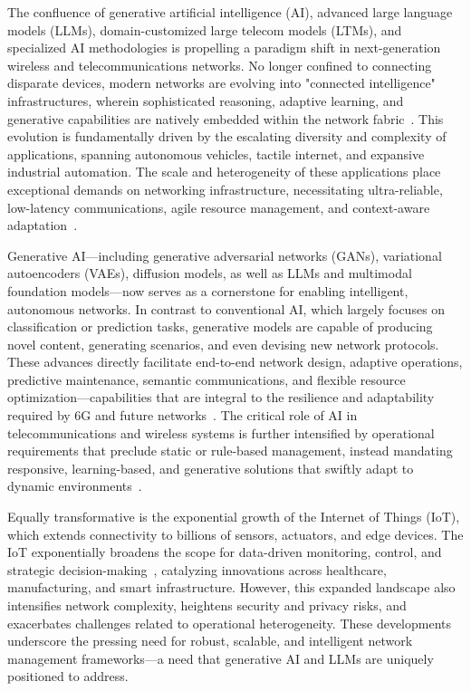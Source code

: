 \documentclass[sigconf]{acmart}
\begin{document}
The confluence of generative artificial intelligence (AI), advanced large language models (LLMs), domain-customized large telecom models (LTMs), and specialized AI methodologies is propelling a paradigm shift in next-generation wireless and telecommunications networks. No longer confined to connecting disparate devices, modern networks are evolving into "connected intelligence" infrastructures, wherein sophisticated reasoning, adaptive learning, and generative capabilities are natively embedded within the network fabric~\cite{ref46,ref49}. This evolution is fundamentally driven by the escalating diversity and complexity of applications, spanning autonomous vehicles, tactile internet, and expansive industrial automation. The scale and heterogeneity of these applications place exceptional demands on networking infrastructure, necessitating ultra-reliable, low-latency communications, agile resource management, and context-aware adaptation~\cite{ref46,ref49}.

Generative AI—including generative adversarial networks (GANs), variational autoencoders (VAEs), diffusion models, as well as LLMs and multimodal foundation models—now serves as a cornerstone for enabling intelligent, autonomous networks. In contrast to conventional AI, which largely focuses on classification or prediction tasks, generative models are capable of producing novel content, generating scenarios, and even devising new network protocols. These advances directly facilitate end-to-end network design, adaptive operations, predictive maintenance, semantic communications, and flexible resource optimization—capabilities that are integral to the resilience and adaptability required by 6G and future networks~\cite{ref1,ref7,ref21,ref26,ref33}. The critical role of AI in telecommunications and wireless systems is further intensified by operational requirements that preclude static or rule-based management, instead mandating responsive, learning-based, and generative solutions that swiftly adapt to dynamic environments~\cite{ref13,ref21,ref26}.

Equally transformative is the exponential growth of the Internet of Things (IoT), which extends connectivity to billions of sensors, actuators, and edge devices. The IoT exponentially broadens the scope for data-driven monitoring, control, and strategic decision-making~\cite{ref45}, catalyzing innovations across healthcare, manufacturing, and smart infrastructure. However, this expanded landscape also intensifies network complexity, heightens security and privacy risks, and exacerbates challenges related to operational heterogeneity. These developments underscore the pressing need for robust, scalable, and intelligent network management frameworks—a need that generative AI and LLMs are uniquely positioned to address.
\end{document}
